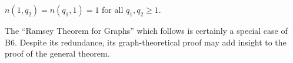 $n(1, q_2) = n(q_1, 1) = 1$ for all $q_1, q_2 \geq 1$.

The “Ramsey Theorem for Graphs” which follows is certainly a special case of B6. Despite its redundance, its graph-theoretical proof may add insight to the proof of the general theorem.
